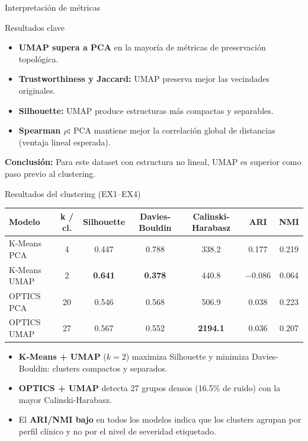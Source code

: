 \documentclass[10pt,aspectratio=169]{beamer}
\begin{document}
\begin{frame}{Interpretación de métricas}
  \begin{block}{Resultados clave}
    \begin{itemize}
      \item \textbf{UMAP supera a PCA} en la mayoría de métricas de preservación topológica.
      \item \textbf{Trustworthiness y Jaccard:} UMAP preserva mejor las vecindades originales.
      \item \textbf{Silhouette:} UMAP produce estructuras más compactas y separables.
      \item \textbf{Spearman $\rho$:} PCA mantiene mejor la correlación global de distancias (ventaja lineal esperada).
    \end{itemize}
  \end{block}

  \vspace{0.3cm}
  \textbf{Conclusión:} Para este dataset con estructura no lineal, UMAP es superior como paso previo al clustering.
\end{frame}

\begin{frame}{Resultados del clustering (EX1--EX4)}
  \begin{center}
    \small
    \begin{tabular}{lcccccc}
      \toprule
      \textbf{Modelo} & \textbf{k / cl.} & \textbf{Silhouette} & \textbf{Davies-Bouldin} & \textbf{Calinski-Harabasz} & \textbf{ARI} & \textbf{NMI} \\
      \midrule
      K-Means PCA   & 4  & 0.447 & 0.788 & 338.2  & 0.177 & 0.219 \\
      K-Means UMAP  & 2  & \textbf{0.641} & \textbf{0.378} & 440.8  & $-0.086$ & 0.064 \\
      OPTICS PCA    & 20 & 0.546 & 0.568 & 506.9  & 0.038 & 0.223 \\
      OPTICS UMAP   & 27 & 0.567 & 0.552 & \textbf{2194.1} & 0.036 & 0.207 \\
      \bottomrule
    \end{tabular}
  \end{center}

  \vspace{0.2cm}
  \begin{itemize}
    \item \textbf{K-Means + UMAP} ($k=2$) maximiza Silhouette y minimiza Davies-Bouldin: clusters compactos y separados.
    \item \textbf{OPTICS + UMAP} detecta 27 grupos densos (16.5\% de ruido) con la mayor Calinski-Harabasz.
    \item El \textbf{ARI/NMI bajo} en todos los modelos indica que los clusters agrupan por perfil clínico y no por el nivel de severidad etiquetado.
  \end{itemize}
\end{frame}
\end{document}
